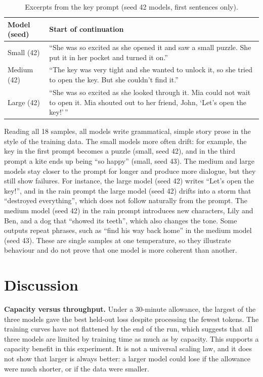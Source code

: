 \documentclass[11pt,a4paper]{article}
\begin{document}
\begin{table}[h]
\centering
\small
\begin{tabular}{@{}lp{}@{}}
\toprule
Model (seed) & Start of continuation \\
\midrule
Small (42) & ``She was so excited as she opened it and saw a small puzzle. She put it in her pocket and turned it on.'' \\
Medium (42) & ``The key was very tight and she wanted to unlock it, so she tried to open the key. But she couldn't find it.'' \\
Large (42) & ``She was so excited as she looked through it. Mia could not wait to open it. Mia shouted out to her friend, John, `Let's open the key!'\,'' \\
\bottomrule
\end{tabular}
\caption{Excerpts from the key prompt (seed 42 models, first sentences only).}
\label{tab:samples}
\end{table}

Reading all 18 samples, all models write grammatical, simple story prose in the style of the training data. The small models more often drift: for example, the key in the first prompt becomes a puzzle (small, seed 42), and in the third prompt a kite ends up being ``so happy'' (small, seed 43). The medium and large models stay closer to the prompt for longer and produce more dialogue, but they still show failures. For instance, the large model (seed 42) writes ``Let's open the key!'', and in the rain prompt the large model (seed 42) drifts into a storm that ``destroyed everything'', which does not follow naturally from the prompt. The medium model (seed 42) in the rain prompt introduces new characters, Lily and Ben, and a dog that ``showed its teeth'', which also changes the tone. Some outputs repeat phrases, such as ``find his way back home'' in the medium model (seed 43). These are single samples at one temperature, so they illustrate behaviour and do not prove that one model is more coherent than another.

\section{Discussion}
\textbf{Capacity versus throughput.} Under a 30-minute allowance, the largest of the three models gave the best held-out loss despite processing the fewest tokens. The training curves have not flattened by the end of the run, which suggests that all three models are limited by training time as much as by capacity. This supports a capacity benefit in this experiment. It is not a universal scaling law, and it does not show that larger is always better: a larger model could lose if the allowance were much shorter, or if the data were smaller.
\end{document}
